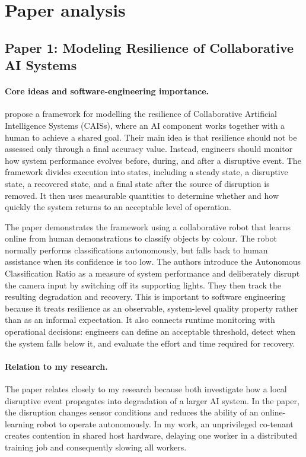 \documentclass{article}
\begin{document}
\section{Paper analysis}
\subsection{Paper 1: Modeling Resilience of Collaborative AI Systems}
\paragraph{Core ideas and software-engineering importance.}

\cite{rimawi2024} propose a framework for modelling the resilience of
Collaborative Artificial Intelligence Systems (CAISs), where an AI component
works together with a human to achieve a shared goal. Their main idea is that
resilience should not be assessed only through a final accuracy value. Instead,
engineers should monitor how system performance evolves before, during, and
after a disruptive event. The framework divides execution into states,
including a steady state, a disruptive state, a recovered state, and a final
state after the source of disruption is removed. It then uses measurable
quantities to determine whether and how quickly the system returns to an
acceptable level of operation.

The paper demonstrates the framework using a collaborative robot that learns
online from human demonstrations to classify objects by colour. The robot
normally performs classifications autonomously, but falls back to human
assistance when its confidence is too low. The authors introduce the
Autonomous Classification Ratio as a measure of system performance and
deliberately disrupt the camera input by switching off its supporting lights.
They then track the resulting degradation and recovery. This is important to
software engineering because it treats resilience as an observable,
system-level quality property rather than as an informal expectation. It also
connects runtime monitoring with operational decisions: engineers can define
an acceptable threshold, detect when the system falls below it, and evaluate
the effort and time required for recovery.

\paragraph{Relation to my research.}

The paper relates closely to my research because both investigate how a local
disruptive event propagates into degradation of a larger AI system. In the
paper, the disruption changes sensor conditions and reduces the ability of an
online-learning robot to operate autonomously. In my work, an unprivileged
co-tenant creates contention in shared host hardware, delaying one worker in a
distributed training job and consequently slowing all workers.
\end{document}
